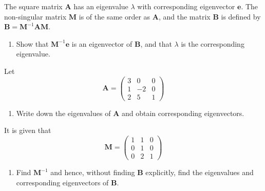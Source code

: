\documentclass[leqno]{article}
\begin{document}
\begin{enumerate}[
  label=\textbf{\arabic*.},
  leftmargin=*,
  topsep=0pt,
  partopsep=0pt,
  parsep=0pt
]
\newpage

\questionitem

The square matrix $\mathbf{A}$ has an eigenvalue $\lambda$ with corresponding eigenvector $\mathbf{e}$. The non-singular matrix $\mathbf{M}$ is of the same order as $\mathbf{A}$, and the matrix $\mathbf{B}$ is defined by $\mathbf{B} = \mathbf{M}^{-1}\mathbf{A}\mathbf{M}$. \\
\begin{enumerate}[label=\textbf{(\alph*)}]
  \item Show that $\mathbf{M}^{-1}\mathbf{e}$ is an eigenvector of $\mathbf{B}$, and that $\lambda$ is the corresponding eigenvalue.  \\
\end{enumerate}
Let
\[\mathbf{A} = \begin{pmatrix} 3 & 0 & 0 \\ 1 & -2 & 0 \\ 2 & 5 & 1 \end{pmatrix}\]
\begin{enumerate}[label=\textbf{(\alph*)}, resume]
  \item Write down the eigenvalues of $\mathbf{A}$ and obtain corresponding eigenvectors.  \\
\end{enumerate}
It is given that
\[\mathbf{M} = \begin{pmatrix} 1 & 1 & 0 \\ 0 & 1 & 0 \\ 0 & 2 & 1 \end{pmatrix}\]
\begin{enumerate}[label=\textbf{(\alph*)}, resume]
  \item Find $\mathbf{M}^{-1}$ and hence, without finding $\mathbf{B}$ explicitly, find the eigenvalues and corresponding eigenvectors of $\mathbf{B}$.  \\
\end{enumerate}

\newpage

\questionitem


\end{enumerate}
\end{document}
